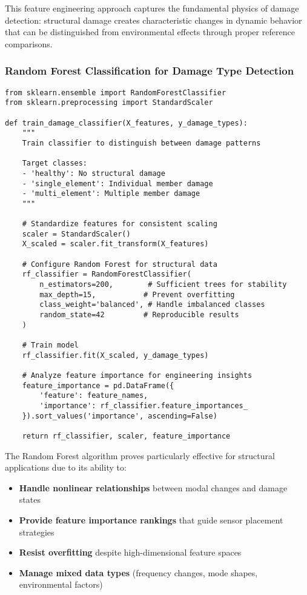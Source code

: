 \documentclass[11pt,a4paper]{article}
\begin{document}
This feature engineering approach captures the fundamental physics of damage detection: structural damage creates characteristic changes in dynamic behavior that can be distinguished from environmental effects through proper reference comparisons.

\subsubsection{Random Forest Classification for Damage Type Detection}

\begin{lstlisting}[caption={Random Forest Classifier Training}]
from sklearn.ensemble import RandomForestClassifier
from sklearn.preprocessing import StandardScaler

def train_damage_classifier(X_features, y_damage_types):
    """
    Train classifier to distinguish between damage patterns
    
    Target classes:
    - 'healthy': No structural damage
    - 'single_element': Individual member damage
    - 'multi_element': Multiple member damage
    """
    
    # Standardize features for consistent scaling
    scaler = StandardScaler()
    X_scaled = scaler.fit_transform(X_features)
    
    # Configure Random Forest for structural data
    rf_classifier = RandomForestClassifier(
        n_estimators=200,        # Sufficient trees for stability
        max_depth=15,           # Prevent overfitting
        class_weight='balanced', # Handle imbalanced classes
        random_state=42         # Reproducible results
    )
    
    # Train model
    rf_classifier.fit(X_scaled, y_damage_types)
    
    # Analyze feature importance for engineering insights
    feature_importance = pd.DataFrame({
        'feature': feature_names,
        'importance': rf_classifier.feature_importances_
    }).sort_values('importance', ascending=False)
    
    return rf_classifier, scaler, feature_importance
\end{lstlisting}

The Random Forest algorithm proves particularly effective for structural applications due to its ability to:
\begin{itemize}
    \item \textbf{Handle nonlinear relationships} between modal changes and damage states
    \item \textbf{Provide feature importance rankings} that guide sensor placement strategies
    \item \textbf{Resist overfitting} despite high-dimensional feature spaces
    \item \textbf{Manage mixed data types} (frequency changes, mode shapes, environmental factors)
\end{itemize}
\end{document}

